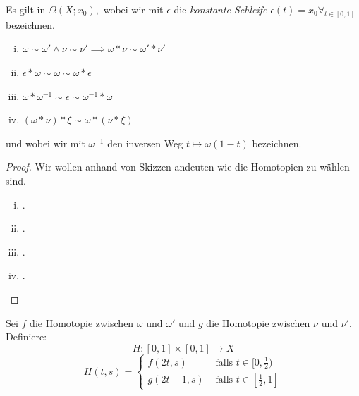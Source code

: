 \documentclass[a4paper,10pt]{scrartcl}
\begin{document}
\begin{lem}  \label{thm:2.1.5}
 Es gilt in $\Omega(X;x_0),$ wobei wir mit $\epsilon$ die \emph{konstante Schleife} 
$\epsilon(t)=x_0 \forall_{t\in [0,1]}$ bezeichnen.
\begin{enumerate}[(i)]
 \item $\omega \sim \omega' \land \nu \sim \nu' \implies \omega *\nu \sim \omega' * \nu'$
  \item $\epsilon * \omega \sim \omega \sim \omega* \epsilon$ 
\item $\omega * \omega^{-1} \sim \epsilon \sim \omega^{-1}*\omega$
 \item $(\omega * \nu)*\xi \sim \omega*(\nu * \xi)$
\end{enumerate}
und wobei wir mit $\omega^{-1}$ den inversen Weg $t\mapsto \omega(1-t)$ bezeichnen.
\end{lem}
\begin{proof}
Wir wollen anhand von Skizzen andeuten wie die Homotopien zu wählen sind.
\begin{enumerate}[(i)]
\item .
\begin{figure}[H]
\centering

\caption{}
\end{figure}
\item .
\begin{figure}[H]
\centering

\caption{}
\end{figure}
\item .
\begin{figure}[H]
\centering

\caption{}
\end{figure}
\item .
\begin{figure}[H]
\centering

\caption{}
\end{figure}
\end{enumerate}
\end{proof}
\begin{note*}
Sei $f$ die Homotopie zwischen $\omega$ und $\omega'$ und $g$ die Homotopie zwischen $\nu$ und $ \nu'$. Definiere:
\[
 H:[0,1]\times[0,1]\to X
\]
\[
 H(t,s)=\begin{cases} f(2t, s) &\text{ falls } t\in [0, \frac{1}{2}) \\ g(2t-1,s) &\text{ falls } t\in [\frac{1}{2}, 1] \end{cases}
\]
\end{note*}
\end{document}
